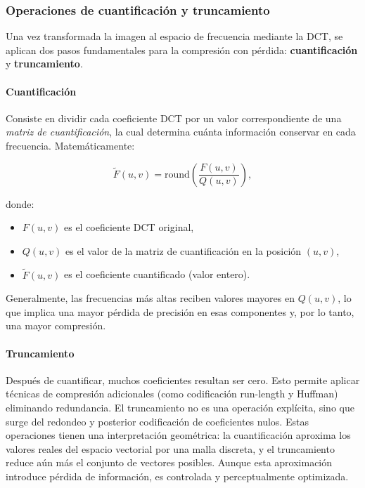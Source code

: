 \documentclass[8pt,a4paper]{article}
\theoremstyle{definition}
\theoremstyle{remark}
\begin{document}
\begin{multicols}{2}
            \subsubsection{Operaciones de cuantificación y truncamiento}
            
            Una vez transformada la imagen al espacio de frecuencia mediante la DCT, se aplican dos pasos fundamentales para la compresión con pérdida: \textbf{cuantificación} y \textbf{truncamiento}.
            
            \paragraph{Cuantificación}

            Consiste en dividir cada coeficiente DCT por un valor correspondiente de una \textit{matriz de cuantificación}, la cual determina cuánta información conservar en cada frecuencia. Matemáticamente:
            
            \[
            \tilde{F}(u,v) = \text{round} \left( \frac{F(u,v)}{Q(u,v)} \right),
            \]
            
            donde:
            \begin{itemize}
                \item \( F(u,v) \) es el coeficiente DCT original,
                \item \( Q(u,v) \) es el valor de la matriz de cuantificación en la posición \( (u,v) \),
                \item \( \tilde{F}(u,v) \) es el coeficiente cuantificado (valor entero).
            \end{itemize}
            
            Generalmente, las frecuencias más altas reciben valores mayores en \(Q(u,v)\), lo que implica una mayor pérdida de precisión en esas componentes y, por lo tanto, una mayor compresión.
            
            \paragraph{Truncamiento}
            Después de cuantificar, muchos coeficientes resultan ser cero. Esto permite aplicar técnicas de compresión adicionales (como codificación run-length y Huffman) eliminando redundancia. El truncamiento no es una operación explícita, sino que surge del redondeo y posterior codificación de coeficientes nulos.
            Estas operaciones tienen una interpretación geométrica: la cuantificación aproxima los valores reales del espacio vectorial por una malla discreta, y el truncamiento reduce aún más el conjunto de vectores posibles. Aunque esta aproximación introduce pérdida de información, es controlada y perceptualmente optimizada.
    

\end{multicols}
\end{document}
